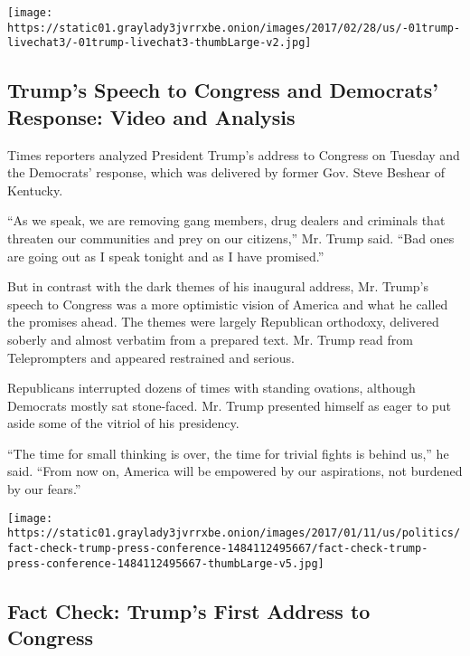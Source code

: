 \texttt{[image: https://static01.graylady3jvrrxbe.onion/images/2017/02/28/us/-01trump-livechat3/-01trump-livechat3-thumbLarge-v2.jpg]}

\hypertarget{trumps-speech-to-congress-and-democrats-response-video-and-analysis}{%
\subsection{Trump's Speech to Congress and Democrats' Response: Video
and
Analysis}\label{trumps-speech-to-congress-and-democrats-response-video-and-analysis}}

Times reporters analyzed President Trump's address to Congress on
Tuesday and the Democrats' response, which was delivered by former Gov.
Steve Beshear of Kentucky.

``As we speak, we are removing gang members, drug dealers and criminals
that threaten our communities and prey on our citizens,'' Mr. Trump
said. ``Bad ones are going out as I speak tonight and as I have
promised.''

But in contrast with the dark themes of his inaugural address, Mr.
Trump's speech to Congress was a more optimistic vision of America and
what he called the promises ahead. The themes were largely Republican
orthodoxy, delivered soberly and almost verbatim from a prepared text.
Mr. Trump read from Teleprompters and appeared restrained and serious.

Republicans interrupted dozens of times with standing ovations, although
Democrats mostly sat stone-faced. Mr. Trump presented himself as eager
to put aside some of the vitriol of his presidency.

``The time for small thinking is over, the time for trivial fights is
behind us,'' he said. ``From now on, America will be empowered by our
aspirations, not burdened by our fears.''

\href{https://www.nytimes3xbfgragh.onion/interactive/2017/02/28/us/politics/fact-check-trump-congress-address.html}{}

\texttt{[image: https://static01.graylady3jvrrxbe.onion/images/2017/01/11/us/politics/fact-check-trump-press-conference-1484112495667/fact-check-trump-press-conference-1484112495667-thumbLarge-v5.jpg]}

\hypertarget{fact-check-trumps-first-address-to-congress}{%
\subsection{Fact Check: Trump's First Address to
Congress}\label{fact-check-trumps-first-address-to-congress}}

